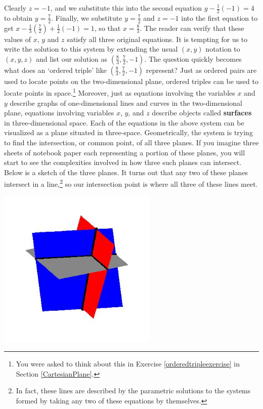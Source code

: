Clearly $z = -1$, and we substitute this into the second equation $y - \frac{1}{2} (-1) = 4$ to obtain $y = \frac{7}{2}$.  Finally, we substitute $y = \frac{7}{2}$ and $z=-1$ into the first equation to get $x - \frac{1}{3}\left(\frac{7}{2}\right) + \frac{1}{2}(-1) = 1$, so that $x = \frac{8}{3}$.  The reader can verify that these values of $x$, $y$ and $z$ satisfy all three original equations.  It is tempting for us to write the solution to this system by extending the usual $(x,y)$ notation to $(x,y,z)$ and list our solution as $\left(\frac{8}{3},\frac{7}{2},-1\right)$.  The question quickly becomes what does an `ordered triple' like $\left(\frac{8}{3},\frac{7}{2},-1\right)$ represent?  Just as ordered pairs are used to locate points on the two-dimensional plane, ordered triples can be used to locate points in space.\footnote{You were asked to think about this in Exercise \ref{orderedtripleexercise} in Section \ref{CartesianPlane}.}  Moreover, just as equations involving the variables $x$ and $y$ describe graphs of one-dimensional lines and curves in the two-dimensional plane, equations involving variables $x$, $y$, and $z$ describe objects called \textbf{surfaces} in three-dimensional space.  Each of the equations in the above system can be visualized as a plane situated in three-space.  Geometrically, the system is trying to find the intersection, or common point, of all three planes. If you imagine three sheets of notebook paper each representing a portion of these planes, you will start to see the complexities involved in how three such planes can intersect. Below is a sketch of the three planes.  It turns out that any two of these planes intersect in a line,\footnote{In fact, these lines are described by the parametric solutions to the systems formed by taking any two of these equations by themselves.} so our intersection point is where all three of these lines meet. 

\centerline{\includegraphics[width=3in]{./MatricesGraphics/3planes01.jpg}}

